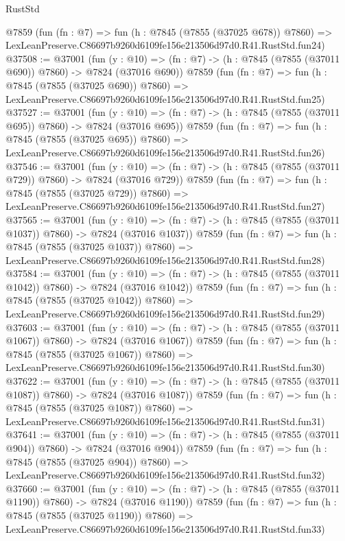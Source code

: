\begin{lexlean}{RustStd}
\begin{coremodule}
    @7859
    (fun (fn : @7) =>
    fun (h : @7845 (@7855 (@37025 @678)) @7860) =>
    LexLeanPreserve.C86697b9260d6109fe156e213506d97d0.R41.RustStd.fun24)
@37508 := @37001
    (fun (y : @10) => (fn : @7) -> (h : @7845 (@7855 (@37011 @690)) @7860) -> @7824 (@37016 @690))
    @7859
    (fun (fn : @7) =>
    fun (h : @7845 (@7855 (@37025 @690)) @7860) =>
    LexLeanPreserve.C86697b9260d6109fe156e213506d97d0.R41.RustStd.fun25)
@37527 := @37001
    (fun (y : @10) => (fn : @7) -> (h : @7845 (@7855 (@37011 @695)) @7860) -> @7824 (@37016 @695))
    @7859
    (fun (fn : @7) =>
    fun (h : @7845 (@7855 (@37025 @695)) @7860) =>
    LexLeanPreserve.C86697b9260d6109fe156e213506d97d0.R41.RustStd.fun26)
@37546 := @37001
    (fun (y : @10) => (fn : @7) -> (h : @7845 (@7855 (@37011 @729)) @7860) -> @7824 (@37016 @729))
    @7859
    (fun (fn : @7) =>
    fun (h : @7845 (@7855 (@37025 @729)) @7860) =>
    LexLeanPreserve.C86697b9260d6109fe156e213506d97d0.R41.RustStd.fun27)
@37565 := @37001
    (fun (y : @10) => (fn : @7) -> (h : @7845 (@7855 (@37011 @1037)) @7860) -> @7824 (@37016 @1037))
    @7859
    (fun (fn : @7) =>
    fun (h : @7845 (@7855 (@37025 @1037)) @7860) =>
    LexLeanPreserve.C86697b9260d6109fe156e213506d97d0.R41.RustStd.fun28)
@37584 := @37001
    (fun (y : @10) => (fn : @7) -> (h : @7845 (@7855 (@37011 @1042)) @7860) -> @7824 (@37016 @1042))
    @7859
    (fun (fn : @7) =>
    fun (h : @7845 (@7855 (@37025 @1042)) @7860) =>
    LexLeanPreserve.C86697b9260d6109fe156e213506d97d0.R41.RustStd.fun29)
@37603 := @37001
    (fun (y : @10) => (fn : @7) -> (h : @7845 (@7855 (@37011 @1067)) @7860) -> @7824 (@37016 @1067))
    @7859
    (fun (fn : @7) =>
    fun (h : @7845 (@7855 (@37025 @1067)) @7860) =>
    LexLeanPreserve.C86697b9260d6109fe156e213506d97d0.R41.RustStd.fun30)
@37622 := @37001
    (fun (y : @10) => (fn : @7) -> (h : @7845 (@7855 (@37011 @1087)) @7860) -> @7824 (@37016 @1087))
    @7859
    (fun (fn : @7) =>
    fun (h : @7845 (@7855 (@37025 @1087)) @7860) =>
    LexLeanPreserve.C86697b9260d6109fe156e213506d97d0.R41.RustStd.fun31)
@37641 := @37001
    (fun (y : @10) => (fn : @7) -> (h : @7845 (@7855 (@37011 @904)) @7860) -> @7824 (@37016 @904))
    @7859
    (fun (fn : @7) =>
    fun (h : @7845 (@7855 (@37025 @904)) @7860) =>
    LexLeanPreserve.C86697b9260d6109fe156e213506d97d0.R41.RustStd.fun32)
@37660 := @37001
    (fun (y : @10) => (fn : @7) -> (h : @7845 (@7855 (@37011 @1190)) @7860) -> @7824 (@37016 @1190))
    @7859
    (fun (fn : @7) =>
    fun (h : @7845 (@7855 (@37025 @1190)) @7860) =>
    LexLeanPreserve.C86697b9260d6109fe156e213506d97d0.R41.RustStd.fun33)

\end{coremodule}
\end{lexlean}
